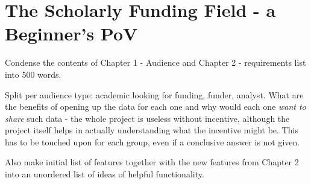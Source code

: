 \chapter{The Scholarly Funding Field - a Beginner's PoV}
\label{funding-blog-post}

Condense the contents of Chapter 1 - Audience and Chapter 2 - requirements list into 500 words.

Split per audience type: academic looking for funding, funder, analyst. What are the benefits of opening up the data for each one and why would each one \emph{want to share} such data - the whole project is useless without incentive, although the project itself helps in actually understanding what the incentive might be. This has to be touched upon for each group, even if a conclusive answer is not given.

Also make initial list of features together with the new features from Chapter 2 into an unordered list of ideas of helpful functionality.